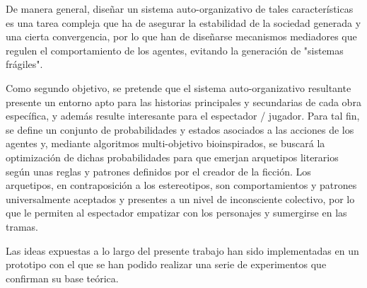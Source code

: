 \begin{resumen}
De manera general, diseñar un sistema auto-organizativo de tales características es una tarea compleja que ha de asegurar la estabilidad de la sociedad generada y una cierta convergencia, por lo que han de diseñarse mecanismos mediadores que regulen el comportamiento de los agentes, evitando la generación de "sistemas frágiles".

Como segundo objetivo, se pretende que el sistema auto-organizativo resultante presente un entorno apto para las historias principales y secundarias de cada obra específica, y además resulte interesante para el espectador / jugador. Para tal fin, se define un conjunto de probabilidades y estados asociados a las acciones de los agentes y, mediante algoritmos multi-objetivo bioinspirados, se buscará la optimización de dichas probabilidades para que emerjan arquetipos literarios según unas reglas y patrones definidos por el creador de la ficción. Los arquetipos, en contraposición a los estereotipos, son comportamientos y patrones universalmente aceptados y presentes a un nivel de inconsciente colectivo, por lo que le permiten al espectador empatizar con los personajes y sumergirse en las tramas. 



Las ideas expuestas a lo largo del presente trabajo han sido implementadas en un prototipo con el que se han podido realizar una serie de experimentos que confirman su base teórica.  





\end{resumen}






